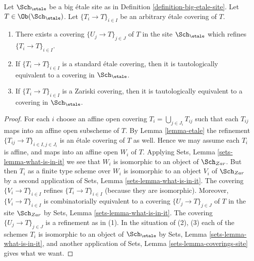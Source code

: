 \begin{lemma}
\label{lemma-etale-induced}
Let $\Sch_\etale$ be a big \'etale site as in
Definition \ref{definition-big-etale-site}.
Let $T \in \Ob(\Sch_\etale)$.
Let $\{T_i \to T\}_{i \in I}$ be an arbitrary \'etale covering of $T$.
\begin{enumerate}
\item There exists a covering $\{U_j \to T\}_{j \in J}$ of $T$ in the site
$\Sch_\etale$ which refines $\{T_i \to T\}_{i \in I}$.
\item If $\{T_i \to T\}_{i \in I}$ is a standard \'etale covering, then
it is tautologically equivalent to a covering in $\Sch_\etale$.
\item If $\{T_i \to T\}_{i \in I}$ is a Zariski covering, then
it is tautologically equivalent to a covering in $\Sch_\etale$.
\end{enumerate}
\end{lemma}

\begin{proof}
For each $i$ choose an affine open covering $T_i = \bigcup_{j \in J_i} T_{ij}$
such that each $T_{ij}$ maps into an affine open subscheme of $T$. By
Lemma \ref{lemma-etale}
the refinement $\{T_{ij} \to T\}_{i \in I, j \in J_i}$ is an \'etale covering
of $T$ as well. Hence we may assume each $T_i$ is affine, and maps into
an affine open $W_i$ of $T$. Applying
Sets, Lemma \ref{sets-lemma-what-is-in-it}
we see that $W_i$ is isomorphic to an object of $\Sch_{Zar}$.
But then $T_i$ as a finite type scheme over $W_i$
is isomorphic to an object $V_i$ of $\Sch_{Zar}$ by a second
application of
Sets, Lemma \ref{sets-lemma-what-is-in-it}.
The covering $\{V_i \to T\}_{i \in I}$ refines $\{T_i \to T\}_{i \in I}$
(because they are isomorphic).
Moreover, $\{V_i \to T\}_{i \in I}$ is combinatorially equivalent to a
covering $\{U_j \to T\}_{j \in J}$ of $T$ in the site
$\Sch_{Zar}$ by
Sets, Lemma \ref{sets-lemma-what-is-in-it}.
The covering $\{U_j \to T\}_{j \in J}$ is a refinement as in (1).
In the situation of (2), (3) each of the
schemes $T_i$ is isomorphic to an object of $\Sch_\etale$ by
Sets, Lemma \ref{sets-lemma-what-is-in-it},
and another application of
Sets, Lemma \ref{sets-lemma-coverings-site}
gives what we want.
\end{proof}

